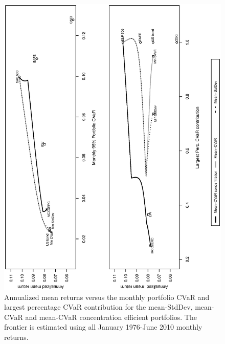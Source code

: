 \documentclass[11pt]{article}
\begin{document}
\vspace{-6cm}


\begin{figure}[tb]
\caption{Annualized mean returns versus the monthly portfolio CVaR and largest percentage CVaR contribution for the mean-StdDev, mean-CVaR and mean-CVaR concentration efficient
portfolios. The frontier is  estimated using all January 1976-June 2010 monthly returns.  }
\includegraphics[width=12cm,angle=270]{frontier_fourassets.eps}
\end{figure}
\end{document}
